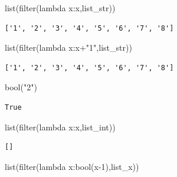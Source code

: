\documentclass[
  letterpaper,
  DIV=11,
  numbers=noendperiod]{scrreprt}
\newenvironment{Shaded}{\begin{snugshade}}{\end{snugshade}}
\newcommand{\BuiltInTok}[1]{\textcolor[rgb]{0.00,0.23,0.31}{#1}}
\newcommand{\DecValTok}[1]{\textcolor[rgb]{0.68,0.00,0.00}{#1}}
\newcommand{\KeywordTok}[1]{\textcolor[rgb]{0.00,0.23,0.31}{#1}}
\newcommand{\NormalTok}[1]{\textcolor[rgb]{0.00,0.23,0.31}{#1}}
\newcommand{\OperatorTok}[1]{\textcolor[rgb]{0.37,0.37,0.37}{#1}}
\newcommand{\StringTok}[1]{\textcolor[rgb]{0.13,0.47,0.30}{#1}}
\begin{document}
\begin{Shaded}
\begin{Highlighting}[]
\BuiltInTok{list}\NormalTok{(}\BuiltInTok{filter}\NormalTok{(}\KeywordTok{lambda}\NormalTok{ x:x,list\_str))}
\end{Highlighting}
\end{Shaded}

\begin{verbatim}
['1', '2', '3', '4', '5', '6', '7', '8']
\end{verbatim}

\begin{Shaded}
\begin{Highlighting}[]
\BuiltInTok{list}\NormalTok{(}\BuiltInTok{filter}\NormalTok{(}\KeywordTok{lambda}\NormalTok{ x:x}\OperatorTok{+}\StringTok{"1"}\NormalTok{,list\_str))}
\end{Highlighting}
\end{Shaded}

\begin{verbatim}
['1', '2', '3', '4', '5', '6', '7', '8']
\end{verbatim}

\begin{Shaded}
\begin{Highlighting}[]
\BuiltInTok{bool}\NormalTok{(}\StringTok{"2"}\NormalTok{)}
\end{Highlighting}
\end{Shaded}

\begin{verbatim}
True
\end{verbatim}

\begin{Shaded}
\begin{Highlighting}[]
\BuiltInTok{list}\NormalTok{(}\BuiltInTok{filter}\NormalTok{(}\KeywordTok{lambda}\NormalTok{ x:x,list\_int))}
\end{Highlighting}
\end{Shaded}

\begin{verbatim}
[]
\end{verbatim}

\begin{Shaded}
\begin{Highlighting}[]
\BuiltInTok{list}\NormalTok{(}\BuiltInTok{filter}\NormalTok{(}\KeywordTok{lambda}\NormalTok{ x:}\BuiltInTok{bool}\NormalTok{(x}\OperatorTok{{-}}\DecValTok{1}\NormalTok{),list\_x))}
\end{Highlighting}
\end{Shaded}
\end{document}
